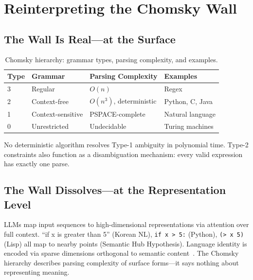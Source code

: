\documentclass[11pt]{article}
\theoremstyle{definition}
\begin{document}
\section{Reinterpreting the Chomsky Wall}\label{sec:chomsky}

\subsection{The Wall Is Real---at the Surface}

\begin{table}[t]
\centering
\caption{Chomsky hierarchy: grammar types, parsing complexity, and examples.}
\label{tab:chomsky}
\small
\begin{tabular}{llll}
\toprule
\textbf{Type} & \textbf{Grammar} & \textbf{Parsing Complexity} & \textbf{Examples} \\
\midrule
3 & Regular & $O(n)$ & Regex \\
2 & Context-free & $O(n^3)$, deterministic & Python, C, Java \\
1 & Context-sensitive & PSPACE-complete & Natural language \\
0 & Unrestricted & Undecidable & Turing machines \\
\bottomrule
\end{tabular}
\end{table}

No deterministic algorithm resolves Type-1 ambiguity in polynomial time. Type-2 constraints also function as a disambiguation mechanism: every valid expression has exactly one parse.

\subsection{The Wall Dissolves---at the Representation Level}

LLMs map input sequences to high-dimensional representations via attention over full context. ``if x is greater than 5'' (Korean NL), \texttt{if x > 5:} (Python), \texttt{(> x 5)} (Lisp) all map to nearby points (Semantic Hub Hypothesis). Language identity is encoded via sparse dimensions orthogonal to semantic content~\cite{zhong2025sparse}. The Chomsky hierarchy describes parsing complexity of surface forms---it says nothing about representing meaning.
\end{document}
